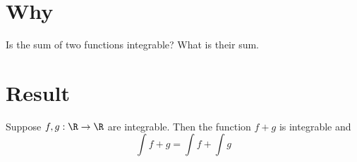 

\section*{Why}

Is the sum of two functions integrable?
What is their sum.

\section*{Result}

\begin{proposition}
Suppose $f, g: \R  \to \R $ are integrable.
Then the function $f+g$ is integrable and
\[
\int f + g = \int f + \int g
\]
\end{proposition}

\blankpage
